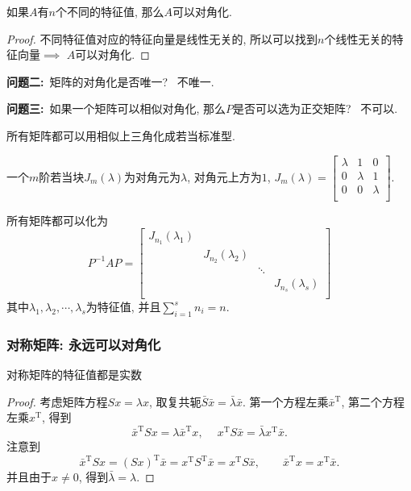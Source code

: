 
\begin{proposition}
    如果$A$有$n$个不同的特征值, 那么$A$可以对角化.
\end{proposition}
\begin{proof}
    不同特征值对应的特征向量是线性无关的, 所以可以找到$n$个线性无关的特征向量$\implies$ $A$可以对角化.
\end{proof}

\textbf{问题二:}\ 矩阵的对角化是否唯一?  \ 不唯一.

\textbf{问题三:}\ 如果一个矩阵可以相似对角化, 那么$P$是否可以选为正交矩阵? \ 不可以.


所有矩阵都可以用相似上三角化成若当标准型.
\begin{definition}
    一个$m$阶若当块$J_{m}\left( \lambda \right) $为对角元为$\lambda$, 对角元上方为$1$, $J_{m}\left( \lambda \right) = \begin{bmatrix}
        \lambda & 1 & 0\\
        0 & \lambda & 1\\
        0 & 0 & \lambda\\
       \end{bmatrix}$.
\end{definition}

所有矩阵都可以化为
\begin{equation}
  P ^{-1}A P = \begin{bmatrix}
   J_{n_1}\left( \lambda_1 \right)  &  &  & \\
    & J_{n_2}\left( \lambda_2 \right)  &  & \\
    &  & \ddots & \\
    &  &  & J_{n_s}\left( \lambda_s \right) \\
  \end{bmatrix}
\end{equation}
其中$\lambda_1,\lambda_2,\cdots,\lambda_s$为特征值, 并且$\sum_{i=1}^{s} n_i = n$.

\subsubsection[对称矩阵]{对称矩阵: 永远可以对角化}

\begin{theorem}
    对称矩阵的特征值都是实数
\end{theorem}
\begin{proof}
    考虑矩阵方程$S x = \lambda x$, 取复共轭$\bar{S} \bar{x} = \bar{\lambda} \bar{x}$.
    第一个方程左乘$\bar{x}^{\mathrm{T}}$, 第二个方程左乘$x^{\mathrm{T}}$, 得到
    \begin{equation}
      \bar{x}^{\mathrm{T}} S x = \lambda \bar{x}^{\mathrm{T}} x,\ \quad x^{\mathrm{T}} S \bar{x} = \bar{\lambda} x^{\mathrm{T}} \bar{x}.
    \end{equation}
    注意到
    \begin{equation}
      \bar{x}^{\mathrm{T}} S x = \left( Sx \right) ^{\mathrm{T}} \bar{x} = x^{\mathrm{T}} S^{\mathrm{T}} \bar{x} = x^{\mathrm{T}} S \bar{x}, \qquad \bar{x}^{\mathrm{T}} x = x^{\mathrm{T}} \bar{x}.
    \end{equation}
    并且由于$x \neq 0$, 得到$\bar{\lambda} = \lambda$.
\end{proof}

